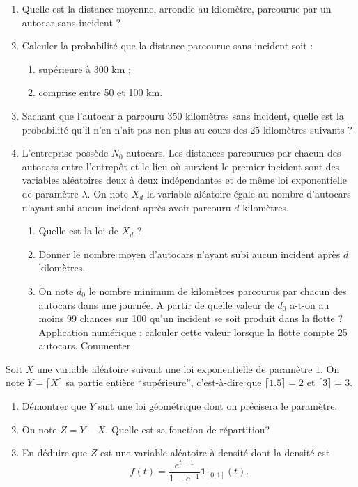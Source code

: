 \documentclass[../PolyS4.tex]{subfiles}
\begin{document}
\begin{enumerate}
 \item Quelle est la distance moyenne, arrondie au kilomètre, parcourue par un autocar sans incident ?
 \item Calculer la probabilité que la distance parcourue sans incident soit :
 \begin{enumerate}
 \item supérieure à 300 km ;
 \item comprise entre 50 et 100 km.
\end{enumerate}
\item Sachant que l'autocar a parcouru 350 kilomètres sans incident, quelle est la probabilité qu'il n'en n'ait pas non plus au cours des 25 kilomètres suivants ?
\item L'entreprise possède $N_0$ autocars. Les distances parcourues par chacun des autocars entre l'entrepôt et le lieu où survient le premier incident sont des variables aléatoires deux à deux indépendantes et de même loi exponentielle de paramètre $\lambda$. On note $X_d$ la variable aléatoire égale au nombre d'autocars n'ayant subi aucun incident après avoir parcouru $d$ kilomètres.
\begin{enumerate}
\item Quelle est la loi de $X_d$ ?
\item Donner le nombre moyen d'autocars n'ayant subi aucun incident après $d$ kilomètres.
\item On note $d_0$ le nombre minimum de kilomètres parcourus par chacun des autocars dans une journée. A partir de quelle valeur de $d_0$ a-t-on au moins 99 chances sur 100 qu'un incident se soit produit dans la flotte ? 
Application numérique : calculer cette valeur lorsque la flotte compte 25 autocars. Commenter.\\
\end{enumerate}
\end{enumerate}





\vspace{0.2cm}
Soit $X$ une variable aléatoire suivant une loi exponentielle de paramètre $1$.
On note $Y=\lceil X\rceil$ sa partie entière ``supérieure'', c'est-à-dire que
$\lceil 1.5\rceil=2$ et $\lceil 3\rceil=3$. 
\begin{enumerate}
 \item Démontrer que $Y$ suit une loi géométrique dont on précisera le paramètre.
\item On note $Z=Y-X$. Quelle est sa fonction de répartition?
\item En déduire que $Z$ est une variable aléatoire à densité dont la densité est
$$f(t)=\frac{e^{t-1}}{1-e^{-1}}\mathbf 1_{[0,1]}(t).$$
\end{enumerate}
\end{document}
